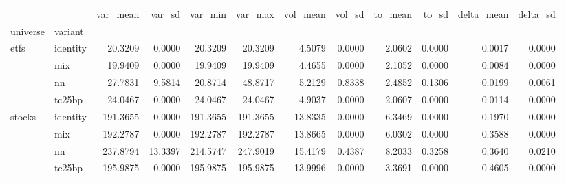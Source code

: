 \begin{tabular}{llrrrrrrrrrr}
\toprule
 &  & var_mean & var_sd & var_min & var_max & vol_mean & vol_sd & to_mean & to_sd & delta_mean & delta_sd \\
universe & variant &  &  &  &  &  &  &  &  &  &  \\
\midrule
\multirow[t]{4}{*}{etfs} & identity & 20.3209 & 0.0000 & 20.3209 & 20.3209 & 4.5079 & 0.0000 & 2.0602 & 0.0000 & 0.0017 & 0.0000 \\
 & mix & 19.9409 & 0.0000 & 19.9409 & 19.9409 & 4.4655 & 0.0000 & 2.1052 & 0.0000 & 0.0084 & 0.0000 \\
 & nn & 27.7831 & 9.5814 & 20.8714 & 48.8717 & 5.2129 & 0.8338 & 2.4852 & 0.1306 & 0.0199 & 0.0061 \\
 & tc25bp & 24.0467 & 0.0000 & 24.0467 & 24.0467 & 4.9037 & 0.0000 & 2.0607 & 0.0000 & 0.0114 & 0.0000 \\
\cline{1-12}
\multirow[t]{4}{*}{stocks} & identity & 191.3655 & 0.0000 & 191.3655 & 191.3655 & 13.8335 & 0.0000 & 6.3469 & 0.0000 & 0.1970 & 0.0000 \\
 & mix & 192.2787 & 0.0000 & 192.2787 & 192.2787 & 13.8665 & 0.0000 & 6.0302 & 0.0000 & 0.3588 & 0.0000 \\
 & nn & 237.8794 & 13.3397 & 214.5747 & 247.9019 & 15.4179 & 0.4387 & 8.2033 & 0.3258 & 0.3640 & 0.0210 \\
 & tc25bp & 195.9875 & 0.0000 & 195.9875 & 195.9875 & 13.9996 & 0.0000 & 3.3691 & 0.0000 & 0.4605 & 0.0000 \\
\cline{1-12}
\bottomrule
\end{tabular}
